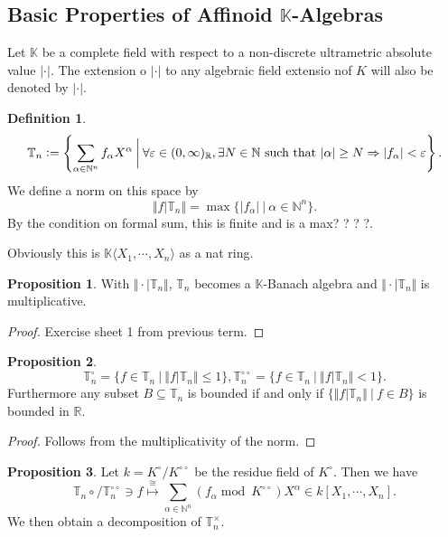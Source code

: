 \documentclass[10pt]{article}
\numberwithin{equation}{section}
\theoremstyle{definition}
\newtheorem{proposition}{Proposition}[subsection]
\newtheorem{definition}{Definition}[subsection]
\DeclareMathOperator{\tmod}{mod}
\newcommand{\defeq}{\vcentcolon=}
\newcommand{\norm}[1]{\Vert #1 \Vert}
\newcommand{\N}[0]{\mathbb{N}}
\newcommand{\R}[0]{\mathbb{R}}
\newcommand{\sep}[0]{\:|\:}
\newcommand{\ab}[1]{\vert #1 \vert}
\newcommand{\dcirc}[0]{{\circ\circ}}
\begin{document}
\subsection{Basic Properties of Affinoid $\mathbb{K}$-Algebras}
Let $\mathbb{K}$ be a complete field with respect to a non-discrete ultrametric absolute value $\ab{\cdot}$. The extension o $\ab{\cdot}$ to any algebraic field extensio nof $K$ will also be denoted by $\ab{\cdot}$.
\begin{definition}
    \label{definition_29_1}
    \begin{equation*}
        \mathbb{T}_n\defeq\left\{\sum_{\alpha\in\N^n}f_\alpha X^\alpha\:\bigg{\vert}\:\forall \varepsilon\in (0,\infty)_{\R}, \exists N\in\N \text{ such that }\ab{\alpha}\geq N\Rightarrow \ab{f_\alpha}<\varepsilon\right\}.
    \end{equation*}
    We define a norm on this space by 
    \begin{equation*}
        \norm{f|\mathbb{T}_n}= \max\{\ab{f_\alpha}\sep \alpha\in\N^n\}.
    \end{equation*}
    By the condition on formal sum, this is finite and is a max? ? ? ?.
\end{definition}
Obviously this is $\mathbb{K}\langle X_1,\cdots,X_n\rangle$ as a nat ring.

\begin{proposition}
    \label{fact_29_1}
    With $\norm{\cdot|\mathbb{T}_n}$, $\mathbb{T}_n$ becomes a $\mathbb{K}$-Banach algebra and $\norm{\cdot|\mathbb{T}_n}$ is multiplicative. 
\end{proposition}
\begin{proof}
    Exercise sheet 1 from previous term.
\end{proof}

\begin{proposition}
    \label{fact_29_2}
    \begin{equation*}
        \mathbb{T}_n^\circ = \{f\in\mathbb{T}_n\sep \norm{f\vert\mathbb{T}_n}\leq 1\},\mathbb{T}_n^\dcirc = \{f\in\mathbb{T}_n\sep \norm{f\vert\mathbb{T}_n}< 1\}.
    \end{equation*}
    Furthermore any subset $B\subseteq\mathbb{T}_n$ is bounded if and only if $\{\norm{f|\mathbb{T}_n}\sep f\in B\}$ is bounded in $\R$.
\end{proposition}
\begin{proof}
    Follows from the multiplicativity of the norm.
\end{proof}

\begin{proposition}
    \label{fact_29_3}
    Let $k=K^\circ/K^\dcirc$ be the residue field of $K^\circ$. Then we have 
    \begin{equation}
        \label{fact_29_3_equation_1}
        \mathbb{T}_n\circ/\mathbb{T}_n^\dcirc \ni f\stackrel{\cong}{\mapsto}\sum_{\alpha\in\N^n}(f_\alpha\tmod\: K^\dcirc)X^\alpha\in k[X_1,\cdots,X_n].
    \end{equation}
    We then obtain a decomposition of $\mathbb{T}_n^\times$.
\end{proposition}
\end{document}
